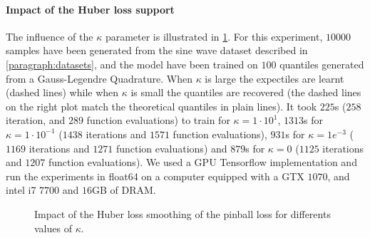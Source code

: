 \paragraph{Impact of the Huber loss support}
The influence of the $\kappa$ parameter is illustrated in
\cref{figure:kappa_study}.  For this experiment, $10000$ samples have been
generated from the sine wave dataset described in \cref{paragraph:datasets},
and the model have been trained on $100$ quantiles generated from a
Gauss-Legendre Quadrature.  When $\kappa$ is large the expectiles are learnt
(dashed lines) while when $\kappa$ is small the quantiles are recovered (the
dashed lines on the right plot match the theoretical quantiles in plain lines).
It took $225$s ($258$ iteration, and $289$ function evaluations) to train
for $\kappa=1\cdot 10^1$, $1313$s for $\kappa=1\cdot 10^{-1}$ ($1438$
iterations and $1571$ function evaluations), $931$s for $\kappa=1e^{-3}$
($1169$ iterations and $1271$ function evaluations) and $879$s for $\kappa=0$
($1125$ iterations and $1207$ function evaluations). We used a GPU Tensorflow
implementation and run the experiments in float64 on a computer equipped with a
GTX $1070$, and intel i7 $7700$ and $16$GB of DRAM.
\begin{figure}[!htbp]
    \centering
    \caption{Impact of the Huber loss smoothing of the pinball loss for
    differents values of $\kappa$. \label{figure:kappa_study}}
\end{figure}
